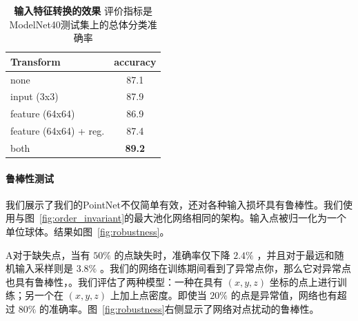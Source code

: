 \begin{table}[b!]
    \small
    \centering
    \begin{tabular}[width=\linewidth]{l|c}
    \hline
    Transform              & accuracy \\ \hline
    none                   & 87.1     \\ \hline
    input (3x3)            & 87.9     \\
    feature (64x64)        & 86.9     \\
    feature (64x64) + reg. & 87.4     \\ \hline
    both                   & \textbf{89.2}     \\ \hline
    \end{tabular}
    \caption{\textbf{输入特征转换的效果} 评价指标是ModelNet40测试集上的总体分类准确率}
    \label{tab:transform}
\end{table}




\paragraph{鲁棒性测试} 我们展示了我们的PointNet不仅简单有效，还对各种输入损坏具有鲁棒性。我们使用与图~\ref{fig:order_invariant}的最大池化网络相同的架构。输入点被归一化为一个单位球体。结果如图~\ref{fig:robustness}。

A对于缺失点，当有 $50\%$ 的点缺失时，准确率仅下降 $2.4\%$ ，并且对于最远和随机输入采样则是 $3.8\%$ 。我们的网络在训练期间看到了异常点你，那么它对异常点也具有鲁棒性，。我们评估了两种模型：一种在具有 $(x,y,z)$ 坐标的点上进行训练；另一个在 $(x,y,z)$ 上加上点密度。即使当 $20\%$ 的点是异常值，网络也有超过 $80\%$ 的准确率。图~\ref{fig:robustness}右侧显示了网络对点扰动的鲁棒性。

